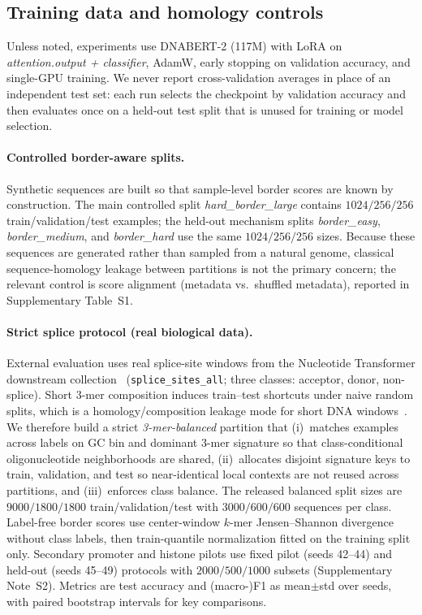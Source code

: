 \documentclass[numsec,webpdf,modern,large]{oup-authoring-template}
\theoremstyle{thmstyleone}
\theoremstyle{thmstylethree}
\newcommand{\splitname}[1]{\textit{#1}}
\newcommand{\modpath}[1]{\textit{#1}}
\begin{document}
\subsection{Training data and homology controls}

Unless noted, experiments use DNABERT-2 (117M) with LoRA on \modpath{attention.output + classifier}, AdamW, early stopping on validation accuracy, and single-GPU training. We never report cross-validation averages in place of an independent test set: each run selects the checkpoint by validation accuracy and then evaluates once on a held-out test split that is unused for training or model selection.

\paragraph{Controlled border-aware splits.}
Synthetic sequences are built so that sample-level border scores are known by construction. The main controlled split \splitname{hard\_border\_large} contains $1024/256/256$ train/validation/test examples; the held-out mechanism splits \splitname{border\_easy}, \splitname{border\_medium}, and \splitname{border\_hard} use the same $1024/256/256$ sizes. Because these sequences are generated rather than sampled from a natural genome, classical sequence-homology leakage between partitions is not the primary concern; the relevant control is score alignment (metadata vs.\ shuffled metadata), reported in Supplementary Table~S1.

\paragraph{Strict splice protocol (real biological data).}
External evaluation uses real splice-site windows from the Nucleotide Transformer downstream collection~\cite{nucleotidetransformer2024} (\texttt{splice\_sites\_all}; three classes: acceptor, donor, non-splice). Short $3$-mer composition induces train--test shortcuts under naive random splits, which is a homology/composition leakage mode for short DNA windows~\cite{jaganathan2019spliceai,zhang2023pangolin}. We therefore build a strict \splitname{3-mer-balanced} partition that (i)~matches examples across labels on GC bin and dominant $3$-mer signature so that class-conditional oligonucleotide neighborhoods are shared, (ii)~allocates disjoint signature keys to train, validation, and test so near-identical local contexts are not reused across partitions, and (iii)~enforces class balance. The released balanced split sizes are $9000/1800/1800$ train/validation/test with $3000/600/600$ sequences per class. Label-free border scores use center-window $k$-mer Jensen--Shannon divergence without class labels, then train-quantile normalization fitted on the training split only. Secondary promoter and histone pilots use fixed pilot (seeds 42--44) and held-out (seeds 45--49) protocols with $2000/500/1000$ subsets (Supplementary Note~S2). Metrics are test accuracy and (macro-)F1 as mean$\pm$std over seeds, with paired bootstrap intervals for key comparisons.
\end{document}

